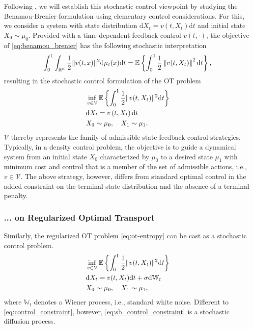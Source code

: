 Following \citet{chen2021optimal, chen2021stochastic}, we will establish this stochastic control viewpoint by studying the Benamou-Brenier formulation using elementary control considerations.
For this, we consider a system with state distribution $\mathrm{d}X_t=v\left(t, X_t\right)\mathrm{d}t$ and initial state $X_0 \sim \mu_0$. Provided with a time-dependent feedback control $v(t, \cdot)$, the objective of \eqref{eq:benamou_brenier} has the following stochastic interpretation
\begin{equation*}
	\int_0^1 \int_{\mathbb{R}^n} \frac{1}{2}\lVert v(t, x)\rVert^2 \mathrm{d}\mu_t(x) \mathrm{d}t = \mathbb{E}\left\{\int_0^1 \frac{1}{2}\left\|v(t, X_t)\right\|^2 \mathrm{d}t\right\},
\end{equation*}
resulting in the stochastic control formulation of the OT problem 
\begin{align}
& \inf _{v \in \mathcal{V}} \mathbb{E}\left\{\int_0^1 \frac{1}{2}\lVert v(t, X_t)\rVert^2 \mathrm{d}t\right\} \\
\label{eq:control_constraint} & \mathrm{d}X_t=v\left(t, X_t\right)\mathrm{d}t  \\
\nonumber & X_0 \sim \mu_0, \quad X_1 \sim \mu_1.
\end{align}
$\mathcal{V}$ thereby represents the family of admissible state feedback control strategies.
Typically, in a density control problem, the objective is to guide a dynamical system from an initial state $X_0$ characterized by $\mu_0$ to a desired state $\mu_1$ with minimum cost and control that is a member of the set of admissible actions, i.e., $v \in \mathcal{V}$. 
The above strategy, however, differs from standard optimal control in the added constraint on the terminal state distribution and the absence of a terminal penalty.


\subsubsection*{... on Regularized Optimal Transport}

Similarly, the regularized OT problem \eqref{eq:ot-entropy} can be cast as a stochastic control problem.
\begin{align}
\label{eq:sb_control}
& \inf _{v \in \mathcal{V}} \mathbb{E}\left\{\int_0^1 \frac{1}{2}\lVert v(t, X_t)\rVert^2 \mathrm{d} t\right\}\\
\label{eq:sb_control_constraint}
& \mathrm{d} X_t = v(t, X_t) \mathrm{d} t + \sigma \mathrm{d} \mathbb{W}_t \\
\nonumber & X_0 \sim \mu_0, \quad X_1 \sim \mu_1,
\end{align}
where $\mathbb{W}_t $ denotes a Wiener process, i.e., standard white noise. 
Different to \eqref{eq:control_constraint}, however, \eqref{eq:sb_control_constraint} is a stochastic diffusion process.


